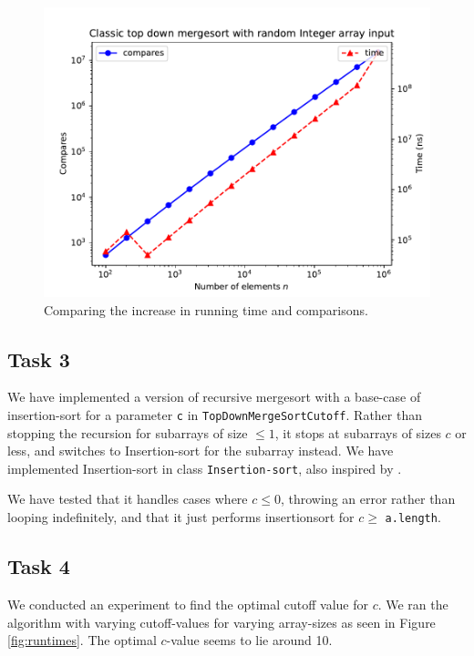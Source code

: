 \documentclass[11pt, a4paper]{article}
\begin{document}
\begin{figure}[h]
  \begin{center}
    \includegraphics[width=\textwidth]{plot/t2p1.pdf}
    \caption{Comparing the increase in running time and comparisons.}
    \label{fig:t2p1}
  \end{center}
\end{figure}

\subsection{Task 3}

We have implemented a version of recursive mergesort with a base-case of insertion-sort for a parameter \verb|c| in \verb|TopDownMergeSortCutoff|. Rather than stopping the recursion for subarrays of size $\leq 1$, it stops at subarrays of sizes $c$ or less, and switches to Insertion-sort for the subarray instead. We have implemented Insertion-sort in class \verb|Insertion-sort|, also inspired by \cite{Sedgewick_Wayne_2011}. 

We have tested that it handles cases where $c\leq 0$, throwing an error rather than looping indefinitely, and that it just performs insertionsort for $c\geq$ \verb|a.length|.

\subsection{Task 4}

We conducted an experiment to find the optimal cutoff value for $c$. We ran the algorithm with varying cutoff-values for varying array-sizes as seen in Figure \ref{fig:runtimes}. The optimal $c$-value seems to lie around 10.
\end{document}
